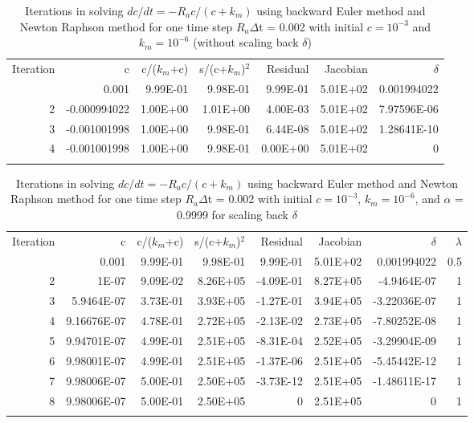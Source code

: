 \documentclass[gmd, manuscript]{copernicus}
\begin{document}
\begin{table}[t]
\caption{Iterations in solving $dc/dt=-R_ac/(c+k_m)$ using backward Euler method
and Newton Raphson method for one time step $R_a\Delta$t = 0.002 with
initial $c=10^{-3}$ and $k_m=10^{-6}$ (without scaling back $\delta$)}
\label{table2}
\begin{tabular}{rrrrrrr}
\tophline
Iteration& c &	c/($k_m$+c)& s/(c+$k_m$)$^2$ & Residual	& Jacobian & $\delta$ \\
\middlehline
1 & 0.001 & 9.99E-01 & 9.98E-01 & 9.99E-01 & 5.01E+02 & 0.001994022  \\
2 & -0.000994022 & 1.00E+00 & 1.01E+00 & 4.00E-03 & 5.01E+02 & 7.97596E-06  \\
3 & -0.001001998 & 1.00E+00 & 9.98E-01 & 6.44E-08 & 5.01E+02 & 1.28641E-10  \\
4 & -0.001001998 & 1.00E+00 & 9.98E-01 & 0.00E+00 & 5.01E+02 & 0  \\
\bottomhline
\end{tabular}
\end{table}

\begin{table}[t]
\caption{Iterations in solving $dc/dt=-R_ac/(c+k_m)$ using backward Euler method
and Newton Raphson method for one time step $R_a\Delta$t = 0.002 with
initial $c=10^{-3}$, $k_m=10^{-6}$, and $\alpha$ = 0.9999 for scaling back $\delta$}
\label{table3}
\begin{tabular}{rrrrrrrr}
\tophline
Iteration& c &	c/($k_m$+c)& s/(c+$k_m$)$^2$ & Residual	& Jacobian & $\delta$ & $\lambda$ \\
\middlehline
1 & 0.001 & 9.99E-01 & 9.98E-01 & 9.99E-01 & 5.01E+02 &	0.001994022 & 0.5 \\
2 & 1E-07 & 9.09E-02 & 8.26E+05 & -4.09E-01 & 8.27E+05 	& -4.9464E-07 &	1 \\
3 & 5.9464E-07 & 3.73E-01 & 3.93E+05 &	-1.27E-01 & 3.94E+05 & -3.22036E-07 & 1 \\
4 & 9.16676E-07 & 4.78E-01 & 2.72E+05 &	-2.13E-02 & 2.73E+05 & -7.80252E-08 & 1 \\
5 & 9.94701E-07	& 4.99E-01 & 2.51E+05 &	-8.31E-04 & 2.52E+05 & -3.29904E-09 & 1 \\
6 & 9.98001E-07	& 4.99E-01 & 2.51E+05 &	-1.37E-06 & 2.51E+05 & -5.45442E-12 & 1 \\
7 & 9.98006E-07	& 5.00E-01 & 2.50E+05 &	-3.73E-12 & 2.51E+05 & -1.48611E-17 & 1 \\
8 & 9.98006E-07	& 5.00E-01 & 2.50E+05 &	0 & 2.51E+05 & 0 & 1\\
\bottomhline
\end{tabular}
\end{table}
\end{document}
